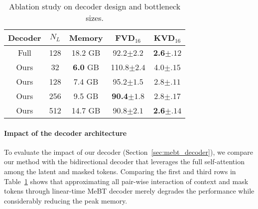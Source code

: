 \documentclass[10pt,twocolumn,letterpaper]{article}
\newcommand{\cutparagraphup}{\vspace*{-0.1in}}
\begin{document}
\begin{table}[t]
    \caption{Ablation study on decoder design and bottleneck sizes.}
    \vspace{-0.3cm}
    \label{tab:16f_ablation}
    \centering
    \footnotesize
    \begin{tabular}{cc|ccc}
    \toprule
    Decoder & $N_L$& Memory & FVD$_{16}$ & KVD$_{16}$ \\
    \midrule
    Full & 128 & 18.2 GB & { 92.2\tiny{$\pm2.2$}} & {\bf 2.6\tiny{$\pm.12$}} \\
    \hline
    Ours & 32 & {\bf 6.0} GB & 110.8\tiny{$\pm2.4$} & 4.0\tiny{$\pm.15$} \\
    Ours & 128 & {7.4} GB & 95.2\tiny{$\pm1.5$} & 2.8\tiny{$\pm.11$} \\
    Ours & 256 & {9.5} GB & {\bf 90.4}\tiny{$\pm1.8$} & 2.8\tiny{$\pm.17$} \\
    Ours & 512 & {14.7} GB & 90.8\tiny{$\pm2.1$} & \bf{2.6}\tiny{$\pm.14$} \\
    \bottomrule
    \end{tabular}
    \vspace{-0.3cm}
\end{table}

\cutparagraphup
\paragraph{Impact of the decoder architecture}
\label{sec:dec_ablation}
To evaluate the impact of our decoder (Section~\ref{sec:mebt_decoder}), we compare our method with the bidirectional decoder that leverages the full self-attention among the latent and masked tokens.
Comparing the first and third rows in Table~\ref{tab:16f_ablation} shows that approximating all pair-wise interaction of context and mask tokens through linear-time MeBT decoder merely degrades the performance while considerably reducing the peak memory.
\end{document}
